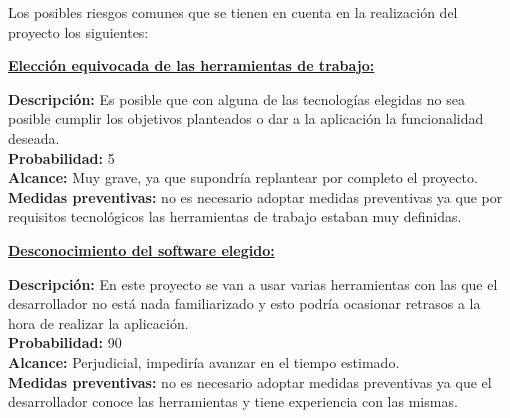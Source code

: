 \hspace*{2em}Los posibles riesgos comunes que se tienen en cuenta en la realización del proyecto los siguientes:\\
	
 	\begin{shaded}
		\underline{\textbf{Elección equivocada de las herramientas de trabajo:}}
		\begin{flushleft}
			\textbf{Descripción:} Es posible que con alguna de las tecnologías elegidas no sea posible cumplir los objetivos planteados o dar a la aplicación la funcionalidad deseada.\\
			\textbf{Probabilidad:} 5\\
			\textbf{Alcance:} Muy grave, ya que supondría replantear por completo el proyecto.\\
			\textbf{Medidas preventivas:} no es necesario adoptar medidas preventivas ya que por requisitos tecnológicos las herramientas de trabajo estaban muy definidas.
		\end{flushleft}	
	\end{shaded}
	
	
	\begin{shaded}
		\underline{\textbf{Desconocimiento del software elegido:}}
		\begin{flushleft}	
			\textbf{Descripción:}  En este proyecto se van a usar varias herramientas con las que el desarrollador no está nada familiarizado y esto podría ocasionar retrasos a la hora de realizar la aplicación.\\
			\textbf{Probabilidad:} 90\\
			\textbf{Alcance:} Perjudicial, impediría avanzar en el tiempo estimado.\\
			\textbf{Medidas preventivas:} no es necesario adoptar medidas preventivas ya que el desarrollador conoce las herramientas y tiene experiencia con las mismas.
		\end{flushleft}			
	\end{shaded}
	
